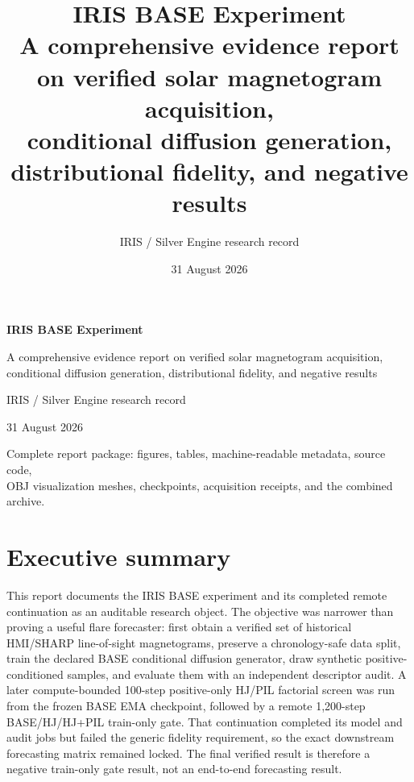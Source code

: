 \documentclass[11pt,oneside]{report}
\title{\textbf{IRIS BASE Experiment}\\[0.4em]
  \Large A comprehensive evidence report on verified solar magnetogram acquisition,\\
  conditional diffusion generation, distributional fidelity, and negative results}
\author{IRIS / Silver Engine research record}
\date{31 August 2026}
\begin{document}
\begin{titlepage}
\thispagestyle{empty}
\centering
\vspace*{12mm}
{\LARGE\bfseries IRIS BASE Experiment\par}
\vspace{7mm}
{\large A comprehensive evidence report on verified solar magnetogram acquisition,\\
conditional diffusion generation, distributional fidelity, and negative results\par}
\vspace{14mm}
{\large IRIS / Silver Engine research record\par}
\vspace{4mm}
{\large 31 August 2026\par}
\vspace{16mm}
\noindent{}\par
\vspace{16mm}
{\small Complete report package: figures, tables, machine-readable metadata, source code,\\
OBJ visualization meshes, checkpoints, acquisition receipts, and the combined archive.\par}
\end{titlepage}

\chapter*{Executive summary}

This report documents the IRIS BASE experiment and its completed remote continuation as an auditable research object. The objective was narrower than proving a useful flare forecaster: first obtain a verified set of historical HMI/SHARP line-of-sight magnetograms, preserve a chronology-safe data split, train the declared BASE conditional diffusion generator, draw synthetic positive-conditioned samples, and evaluate them with an independent descriptor audit. A later compute-bounded 100-step positive-only HJ/PIL factorial screen was run from the frozen BASE EMA checkpoint, followed by a remote 1,200-step BASE/HJ/HJ+PIL train-only gate. That continuation completed its model and audit jobs but failed the generic fidelity requirement, so the exact downstream forecasting matrix remained locked. The final verified result is therefore a negative train-only gate result, not an end-to-end forecasting result.
\end{document}
